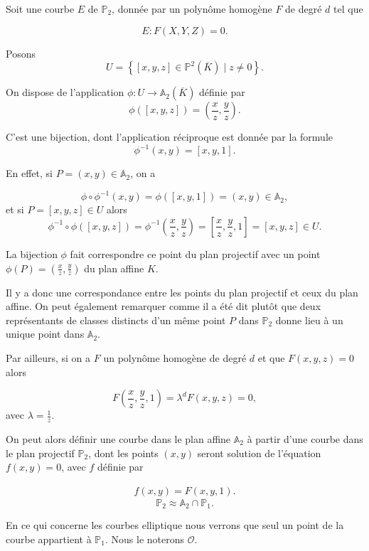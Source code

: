 Soit une courbe $E$ de $\mathbb{P}_{2}$, donnée par un
polynôme homogène $F$ de degré $d$ tel que 

\[
E : F(X,Y,Z)=0
.\] 

Posons 
\[
U = \left\{ [x,y,z] \in \mathbb{P}^2(\overline{K}) \mid z \neq 0 \right\} 
.\] 

On dispose de l'application $\phi : U \to \mathbb{A}_{2}(\overline{K})$ définie par
\[
\phi([x,y,z])=\left( \frac{x}{z},\frac{y}{z} \right) 
.\] 

C'est une bijection, dont l'application réciproque est donnée par la formule
\[
\phi^{-1}(x,y)=\left[ x,y,1 \right] 
.\] 

En effet, si $P = (x,y) \in \mathbb{A}_{2}$, on a

\[
\phi \circ \phi^{-1} (x,y) = \phi([x,y,1]) = (x,y) \in \mathbb{A}_{2}
,\] 
et si $P = [x,y,z] \in U$ alors
\[
\phi^{-1} \circ \phi ([x,y,z]) = \phi^{-1}(\frac{x}{z},\frac{y}{z}) = [\frac{x}{z},\frac{y}{z},1] =
[x,y,z] \in U
.\] 

La bijection $\phi$ fait correspondre ce point du plan projectif avec un point
$\phi(P) = (\frac{x}{z},\frac{y}{z})$ du plan affine $K$. 

Il y a donc une correspondance entre les points du plan projectif et ceux du plan affine.
On peut également remarquer comme il a été dit plutôt que deux représentants de classes
distincts d'un même point $P$ dans $\mathbb{P}_{2}$ donne lieu à un unique point dans
$\mathbb{A}_{2}$.

Par ailleurs, si on a $F$ un polynôme homogène de degré $d$ et que $F(x,y,z) = 0$ alors 

\[
F(\frac{x}{z},\frac{y}{z},1) = \lambda^{d} F(x,y,z) = 0
,\] 
avec $\lambda = \frac{1}{z}$.

On peut alors définir une courbe dans le plan affine $\mathbb{A}_{2}$ à partir d'une
courbe dans le plan projectif $\mathbb{P}_{2}$, dont les points $(x,y)$ seront solution de
l'équation $f(x,y) = 0$, avec $f$ définie par

\begin{align}
    \label{eq:bijectionP2}
    f(x,y) = F(x,y,1)
.\end{align}
\[
\mathbb{P}_{2} \approx \mathbb{A}_{2} \cap \mathbb{P}_{1}
.\] 


\begin{remarque}
    En ce qui concerne les courbes elliptique nous verrons que seul un point de la courbe
    appartient à $\mathbb{P}_{1}$. Nous le noterons $\mathcal{O}$.
\end{remarque}

